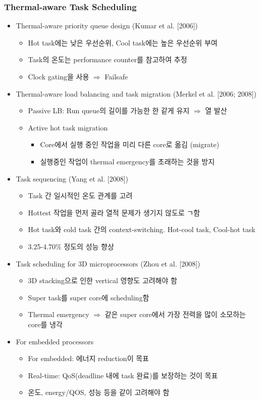 \subsubsection*{Thermal-aware Task Scheduling}
\begin{itemize}
    \item Thermal-aware priority queue design (Kumar et al. [2006])
    \begin{itemize}
        \item Hot task에는 낮은 우선순위, Cool task에는 높은 우선순위 부여
        \item Task의 온도는 performance counter를 참고하여 추정
        \item Clock gating을 사용 $\Rightarrow$ Failsafe
    \end{itemize}
    \item Thermal-aware load balancing and task migration (Merkel et al. [2006; 2008])
    \begin{itemize}
        \item Passive LB: Run queue의 길이를 가능한 한 같게 유지 $\Rightarrow$ 열 발산
        \item Active hot task migration
        \begin{itemize}
            \item Core에서 실행 중인 작업을 미리 다른 core로 옮김 (migrate)
            \item 실행중인 작업이 thermal emergency를 초래하는 것을 방지
        \end{itemize}
    \end{itemize}
    \item Task sequencing (Yang et al. [2008])
    \begin{itemize}
        \item Task 간 일시적인 온도 관계를 고려
        \item Hottest 작업을 먼저 골라 열적 문제가 생기지 않도로 ㄱ함
        \item Hot task와 cold task 간의 context-switching. Hot-cool task, Cool-hot task
        \item 3.25-4.70\% 정도의 성능 향상
    \end{itemize}
    \item Task scheduling for 3D microprocessors (Zhou et al. [2008])
    \begin{itemize}
        \item 3D stacking으로 인한 vertical 영향도 고려해야 함
        \item Super task를 super core에 scheduling함
        \item Thermal emergency $\Rightarrow$ 같은 super core에서 가장 전력을 많이 소모하는 core를 냉각
    \end{itemize}
    \item For embedded processors
    \begin{itemize}
        \item For embedded: 에너지 reduction이 목표
        \item Real-time: QoS(deadline 내에 task 완료)를 보장하는 것이 목표
        \item 온도, energy/QOS, 성능 등을 같이 고려해야 함
    \end{itemize}
\end{itemize}

